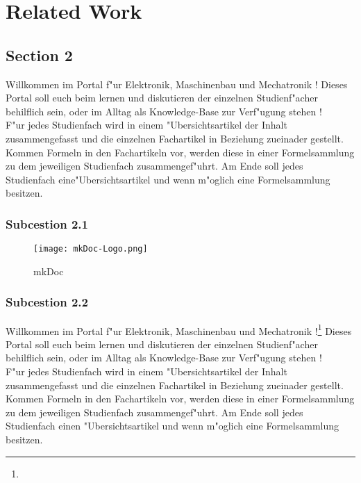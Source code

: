 \chapter{Related Work}
\label{cha:Related Work}

\section{Section 2}
\label{sec:2Section2}
Willkommen im Portal f"ur Elektronik, Maschinenbau und Mechatronik !
Dieses Portal soll euch beim lernen und diskutieren der einzelnen Studienf"acher behilflich sein, oder im Alltag als Knowledge-Base zur Verf"ugung stehen ! \\
F"ur jedes Studienfach wird in einem "Ubersichtsartikel der Inhalt zusammengefasst und die einzelnen Fachartikel in Beziehung zueinader gestellt. 
Kommen Formeln in den Fachartikeln vor, werden diese in einer Formelsammlung zu dem jeweiligen Studienfach zusammengef"uhrt. 
Am Ende soll jedes Studienfach eine"Ubersichtsartikel und wenn m"oglich eine Formelsammlung besitzen.

\subsection{Subcestion 2.1}
\label{subsec:2Subcestion2.1}

\begin{figure}[htb]
\centering
\texttt{[image: mkDoc-Logo.png]}
\caption{mkDoc}
\label{fig:mkDoc}
\end{figure}


\subsection{Subcestion 2.2}
\label{subsec:2Subcestion 2.2}
Willkommen im Portal f"ur Elektronik, Maschinenbau und Mechatronik !\footnote{\Vgl{}}
Dieses Portal soll euch beim lernen und diskutieren der einzelnen Studienf"acher behilflich sein, oder im Alltag als Knowledge-Base zur Verf"ugung stehen ! \\
F"ur jedes Studienfach wird in einem "Ubersichtsartikel der Inhalt zusammengefasst und die einzelnen Fachartikel in Beziehung zueinader gestellt. 
Kommen Formeln in den Fachartikeln vor, werden diese in einer Formelsammlung zu dem jeweiligen Studienfach zusammengef"uhrt. 
Am Ende soll jedes Studienfach einen  "Ubersichtsartikel und wenn m"oglich eine Formelsammlung besitzen.


